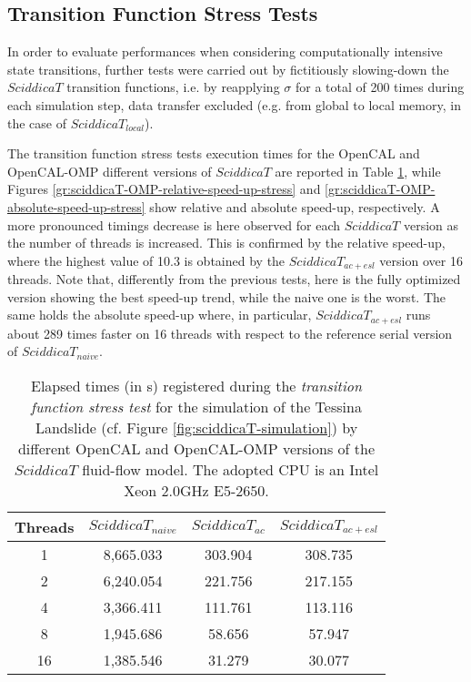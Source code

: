 \subsection{Transition Function Stress Tests}    
In order to evaluate performances when considering
computationally intensive state transitions, further tests were
carried out by fictitiously slowing-down the $SciddicaT$
transition functions, i.e. by reapplying $\sigma$ for a total of
200 times during each simulation step, data transfer excluded
(e.g. from global to local memory, in the case of
$SciddicaT_{local}$).

The transition function stress tests execution times for the
OpenCAL and OpenCAL-OMP different versions of $SciddicaT$ are
reported in Table \ref{tab:sciddicaT-OMP-execution-times-stress},
while Figures \ref{gr:sciddicaT-OMP-relative-speed-up-stress} and
\ref{gr:sciddicaT-OMP-absolute-speed-up-stress} show relative and
absolute speed-up, respectively. A more pronounced timings
decrease is here observed for each $SciddicaT$ version as the
number of threads is increased. This is confirmed by the relative
speed-up, where the highest value of 10.3 is obtained by the
$SciddicaT_{ac+esl}$ version over 16 threads. Note that,
differently from the previous tests, here is the fully optimized
version showing the best speed-up trend, while the naive one is
the worst. The same holds the absolute speed-up where, in
particular, $SciddicaT_{ac+esl}$ runs about 289 times faster on 16
threads with respect to the reference serial version of
$SciddicaT_{naive}$.
\begin{table}
	\centering
	\begin{tabular}{cccc}
		\hline Threads & $SciddicaT_{naive}$ & $SciddicaT_{ac}$ &
		$SciddicaT_{ac+esl}$ \\ \hline 1 & 8,665.033 & 303.904 &
		308.735\\ 2 & 6,240.054 & 221.756 & 217.155\\ 4 & 3,366.411 &
		111.761 & 113.116\\ 8 & 1,945.686 & 58.656 & 57.947\\ 16 &
		1,385.546 & 31.279 & 30.077\\ \hline
	\end{tabular}
	\caption[Elapsed times (in \si{s}) registered during the \emph{transition function stress test} by different OpenCAL and
	OpenCAL-OMP versions of the $SciddicaT$ fluid-flow model.]{Elapsed times (in \si{s}) registered during the \emph{transition function stress test} for the simulation of the Tessina Landslide
		(cf. Figure \ref{fig:sciddicaT-simulation}) by different OpenCAL and
		OpenCAL-OMP versions of the $SciddicaT$ fluid-flow model. The adopted
		CPU is an Intel Xeon 2.0GHz E5-2650.}
	\label{tab:sciddicaT-OMP-execution-times-stress}
\end{table}


